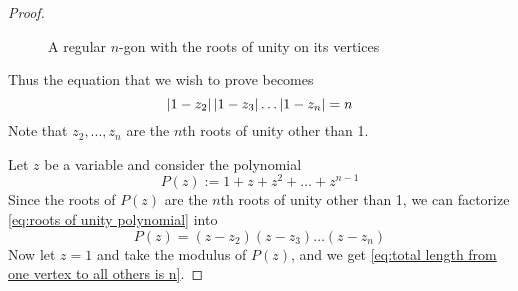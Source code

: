 \documentclass[11pt, oneside]{book}
\begin{document}
\begin{ex}
\begin{proof}
		\begin{figure}[H]
			\begin{center}
			\end{center}
			\caption[loftitle]{A regular $n$-gon with the roots of unity on its vertices}
			\label{figure:regular n-gon with roots of unity}
		\end{figure}

		Thus the equation that we wish to prove becomes
		\begin{equation}\label{eq:total length from one vertex to all others is n}
			\left|1 - z_2\right|\left|1 - z_3\right|\hdots\left|1 - z_n\right| = n
		\end{equation}
		Note that $z_2, ..., z_n$ are the $n$th roots of unity other than 1.

		Let $z$ be a variable and consider the polynomial
		\begin{equation}\label{eq:roots of unity polynomial}
			P(z) := 1 + z + z^2 + \hdots + z^{n - 1}
		\end{equation}
		Since the roots of $P(z)$ are the $n$th roots of unity other than 1, we can factorize \cref{eq:roots of unity polynomial} into
		\begin{equation*}
			P(z) = (z - z_2)(z - z_3) \hdots (z - z_n)
		\end{equation*}
		Now let $z = 1$ and take the modulus of $P(z)$, and we get \cref{eq:total length from one vertex to all others is n}.
	\end{proof}
\end{ex}
\end{document}
